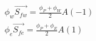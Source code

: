 \documentclass{article}
\begin{document}
\begin{enumerate}
\begin{enumerate}
            \begin{equation}
                \begin{aligned}
                    \phi_w \vec{S_{fw}}= \frac{\phi_P +  \phi_W}{2} A (-1) \\
                    \phi_e \vec{S_{fe}}= \frac{\phi_P +  \phi_E}{2} A (1) 
                    \label{eq:advectivo}
               \end{aligned}      
            \end{equation} 
    
     \end{enumerate} 

\end{enumerate}
\end{document}
